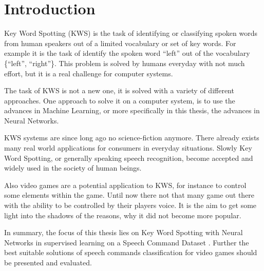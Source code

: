 
\chapter{Introduction}\label{sec:intro}
Key Word Spotting (KWS) is the task of identifying or classifying spoken words from human speakers out of a limited vocabulary or set of key words. 
For example it is the task of identify the spoken word \enquote{left} out of the vocabulary \{\enquote{left}, \enquote{right}\}. 
This problem is solved by humans everyday with not much effort, but it is a real challenge for computer systems.

The task of KWS is not a new one, it is solved with a variety of different approaches.
One approach to solve it on a computer system, is to use the advances in Machine Learning, or more specifically in this thesis, the advances in Neural Networks.

KWS systems are since long ago no science-fiction anymore. 
There already exists many real world applications for consumers in everyday situations.
Slowly Key Word Spotting, or generally speaking speech recognition, become accepted and widely used in the society of human beings.

Also video games are a potential application to KWS, for instance to control some elements within the game.
Until now there not that many game out there with the ability to be controlled by their players voice. 
It is the aim to get some light into the shadows of the reasons, why it did not become more popular.


In summary, the focus of this thesis lies on Key Word Spotting with Neural Networks in supervised learning on a Speech Command Dataset \cite{Warden2018}.
Further the best suitable solutions of speech commands classification for video games should be presented and evaluated.





\newpage










